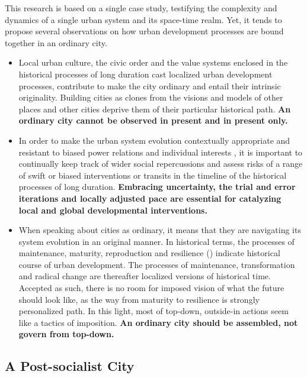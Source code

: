 \documentclass[11pt]{report}
\begin{document}
{{{This research is based on a single case study, testifying the complexity and dynamics of a single urban system and its space-time realm.
Yet, it tends to propose several observations on how urban development processes are bound together in an ordinary city.

\begin{itemize}
\item
Local urban culture, the civic order and the value systems enclosed in the historical processes of long duration cast localized urban development processes, contribute to make the city ordinary and entail their intrinsic originality.
Building cities as clones from the visions and models of other places and other cities
deprive them of their particular historical path.
\textbf{An ordinary city cannot be observed in present and in present only.}

\item 
In order to make the urban system evolution contextually appropriate  and resistant to biased power relations and individual interests , it is important to continually keep track of wider social repercussions and assess risks of a range of swift or biased interventions or
transits in the timeline of the historical processes of long duration.
\textbf{Embracing uncertainty, the trial and error iterations and locally adjusted pace are essential for catalyzing local and global developmental interventions.}

\item
When speaking about cities as ordinary, it means that they are navigating its system evolution in an original manner.
In historical terms, the processes of maintenance, maturity, reproduction and resilience (\href{Galtung}{\citealt{galtung_peace_1996}}) indicate historical course of urban development.
The processes of maintenance, transformation and radical change are thereafter localized versions of historical time.
Accepted as such, there is no room for imposed vision of what the future should look like, as the way from maturity to resilience is strongly personalized path. 
In this light, most of top-down, outside-in actions seem like a tactics of imposition. \textbf{An ordinary city should be assembled, not govern from top-down.}

\end{itemize}

\subsection{A Post-socialist City}

}}}
\end{document}
